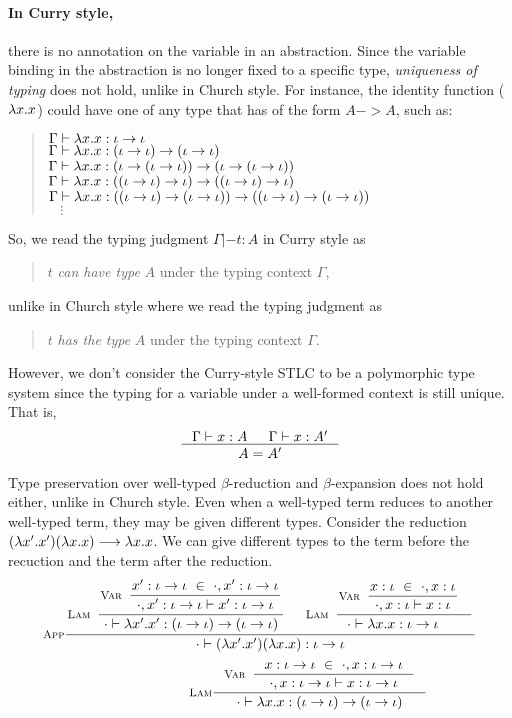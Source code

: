\paragraph{In Curry style,} there is no annotation on the variable in
an abstraction. Since the variable binding in the abstraction is no longer
fixed to a specific type, \emph{uniqueness of typing} does not hold,
unlike in Church style. For instance, the identity function ($\lambda x.x$)
could have one of any type that has of the form $A -> A$, such as:
\begin{quote}\vspace*{-1em}
\begin{singlespace}
$\Gamma |- \lambda x.x : \iota -> \iota$ \\
$\Gamma |- \lambda x.x : (\iota -> \iota) -> (\iota -> \iota)$ \\
$\Gamma |- \lambda x.x : (\iota -> (\iota -> \iota)) -> (\iota -> (\iota -> \iota))$ \\
$\Gamma |- \lambda x.x : ((\iota -> \iota) -> \iota) -> ((\iota -> \iota) -> \iota)$ \\
$\Gamma |- \lambda x.x : ((\iota -> \iota) -> (\iota -> \iota)) -> ((\iota -> \iota) -> (\iota -> \iota))$ \\
$~~~~ \vdots $
\end{singlespace}
\end{quote}
So, we read the typing judgment $\Gamma |- t : A$ in Curry style as
\begin{quote}
$t$ \emph{can have type} $A$ under the typing context $\Gamma$,
\end{quote}
unlike in Church style where we read the typing judgment as
\begin{quote}
$t$ \emph{has the type} $A$ under the typing context $\Gamma$.
\end{quote}
However, we don't consider the Curry-style STLC to be
a polymorphic type system since the typing for a variable
under a well-formed context is still unique. That is,
\[ \inference{\Gamma |- x : A & \Gamma |- x : A'}{A = A'} \]


Type preservation over well-typed $\beta$-reduction and $\beta$-expansion 
does not hold either, unlike in Church style. Even when a well-typed term
reduces to another well-typed term, they may be given different types.
Consider the reduction $(\lambda x'.x')(\lambda x.x) --> \lambda x.x$.
We can give different types to the term before the recuction and the
term after the reduction.
\[\setpremisesend{.1em} 
\inference[\sc App]
 {
   \inference[\sc Lam]
     { \inference[\sc Var]
         {x' : \iota -> \iota ~\in~ \cdot, x' : \iota -> \iota}
         {\cdot,x' : \iota -> \iota |- x': \iota -> \iota}
     }
     {\cdot |- \l x'.x' : (\iota -> \iota) -> (\iota -> \iota)}
 &
   \inference[\sc Lam]
     {\inference[\sc Var]{x:\iota ~\in~ \cdot,x:\iota}
                         {\cdot,x:\iota |- x:\iota} \phantom{x'}}
     {\cdot |- \l x.x : \iota -> \iota \phantom{(x')}}
 }
 {\cdot |- (\l x'.x')(\l x.x) : \iota -> \iota}
\]
\[\qquad\qquad\qquad\quad
\inference[\sc Lam]
  {\inference[\sc Var]{x:\iota->\iota ~\in~ \cdot,x:\iota->\iota}
                      {\cdot,x:\iota->\iota |- x:\iota->\iota} }
  {\cdot |- \l x.x : (\iota -> \iota) -> (\iota -> \iota)}
\]

